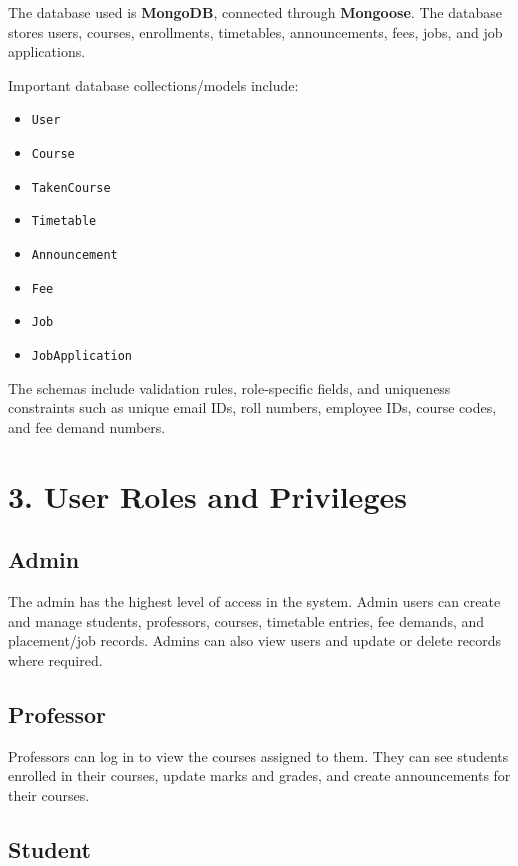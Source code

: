 \documentclass[12pt]{article}
\begin{document}
The database used is \textbf{MongoDB}, connected through \textbf{Mongoose}. The database stores users, courses, enrollments, timetables, announcements, fees, jobs, and job applications.

Important database collections/models include:

\begin{itemize}
\item \texttt{User}
\item \texttt{Course}
\item \texttt{TakenCourse}
\item \texttt{Timetable}
\item \texttt{Announcement}
\item \texttt{Fee}
\item \texttt{Job}
\item \texttt{JobApplication}
\end{itemize}

The schemas include validation rules, role-specific fields, and uniqueness constraints such as unique email IDs, roll numbers, employee IDs, course codes, and fee demand numbers.

\section*{3. User Roles and Privileges}

\subsection*{Admin}

The admin has the highest level of access in the system. Admin users can create and manage students, professors, courses, timetable entries, fee demands, and placement/job records. Admins can also view users and update or delete records where required.

\subsection*{Professor}

Professors can log in to view the courses assigned to them. They can see students enrolled in their courses, update marks and grades, and create announcements for their courses.

\subsection*{Student}
\end{document}
